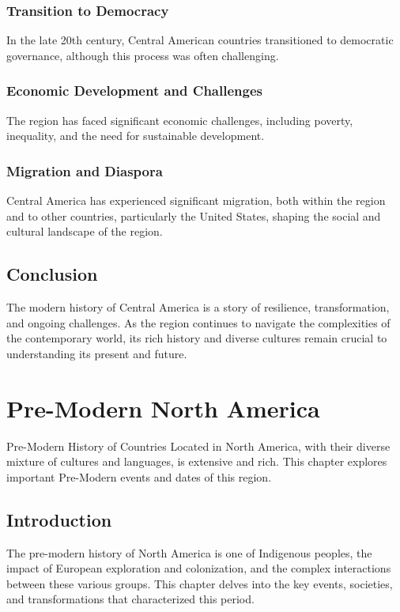 \documentclass[a4paper,12pt]{book}
\begin{document}
\subsection{Transition to Democracy}
\label{subsec:transition-democracy}
In the late 20th century, Central American countries transitioned to democratic governance, although this process was often challenging.

\subsection{Economic Development and Challenges}
\label{subsec:economic-development-challenges}
The region has faced significant economic challenges, including poverty, inequality, and the need for sustainable development.

\subsection{Migration and Diaspora}
\label{subsec:migration-diaspora}
Central America has experienced significant migration, both within the region and to other countries, particularly the United States, shaping the social and cultural landscape of the region.

\section{Conclusion}
\label{sec:conclusion-modern-central-america}
The modern history of Central America is a story of resilience, transformation, and ongoing challenges. As the region continues to navigate the complexities of the contemporary world, its rich history and diverse cultures remain crucial to understanding its present and future.

\chapter{Pre-Modern North America}
\label{ch:pre-modern-history-north-america}

Pre-Modern History of Countries Located in North America, with their diverse mixture of cultures and languages, is extensive and rich. This chapter explores important Pre-Modern events and dates of this region.

\section{Introduction}
\label{sec:introduction-north-america}
The pre-modern history of North America is one of Indigenous peoples, the impact of European exploration and colonization, and the complex interactions between these various groups. This chapter delves into the key events, societies, and transformations that characterized this period.
\end{document}

